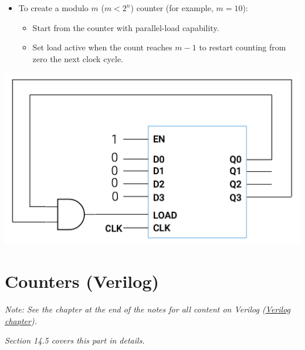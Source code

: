\documentclass[12pt,openany]{book}
\begin{document}
\noindent
\begin{minipage}[htp]{0.45\textwidth}
    \begin{itemize}
        \item[] To create a modulo \(m\) (\(m < 2^n\)) counter (for example, \(m = 10\)):
        \begin{itemize}
            \item Start from the counter with parallel-load capability.
            \item Set load active when the count reaches \(m - 1\) to restart counting from zero the next clock cycle.
        \end{itemize}
    \end{itemize}
\end{minipage}
\hfill
\vline
\hfill
\begin{minipage}[htp]{0.45\textwidth}
    \centering
    \includegraphics[width=1.0\textwidth]{circuits/14.5_4.png} %
\end{minipage}
\newpage
\section{Counters (Verilog)}
 \textit{Note: See the chapter at the end of the notes for all content on Verilog (\hyperref[Verilog]{Verilog chapter}).}

\vspace*{-10px}
\textit{Section 14.5 covers this part in details.}
\end{document}
